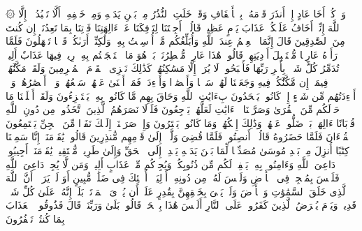 \stopbuffer
\startbuffer[\q:46:21]
۞ وَٱذۡكُرۡ أَخَا عَادٍ إِذۡ أَنذَرَ قَوۡمَهُۥ بِٱلۡأَحۡقَافِ وَقَدۡ خَلَتِ ٱلنُّذُرُ مِنۢ بَیۡنِ یَدَیۡهِ وَمِنۡ خَلۡفِهِۦۤ أَلَّا تَعۡبُدُوۤا۟ إِلَّا ٱللَّهَ إِنِّیۤ أَخَافُ عَلَیۡكُمۡ عَذَابَ یَوۡمٍ عَظِیمࣲ%
\stopbuffer
\startbuffer[\q:46:22]
قَالُوۤا۟ أَجِئۡتَنَا لِتَأۡفِكَنَا عَنۡ ءَالِهَتِنَا فَأۡتِنَا بِمَا تَعِدُنَاۤ إِن كُنتَ مِنَ ٱلصَّٰدِقِینَ%
\stopbuffer
\startbuffer[\q:46:23]
قَالَ إِنَّمَا ٱلۡعِلۡمُ عِندَ ٱللَّهِ وَأُبَلِّغُكُم مَّاۤ أُرۡسِلۡتُ بِهِۦ وَلَٰكِنِّیۤ أَرَىٰكُمۡ قَوۡمࣰا تَجۡهَلُونَ%
\stopbuffer
\startbuffer[\q:46:24]
فَلَمَّا رَأَوۡهُ عَارِضࣰا مُّسۡتَقۡبِلَ أَوۡدِیَتِهِمۡ قَالُوا۟ هَٰذَا عَارِضࣱ مُّمۡطِرُنَاۚ بَلۡ هُوَ مَا ٱسۡتَعۡجَلۡتُم بِهِۦۖ رِیحࣱ فِیهَا عَذَابٌ أَلِیمࣱ%
\stopbuffer
\startbuffer[\q:46:25]
تُدَمِّرُ كُلَّ شَیۡءِۭ بِأَمۡرِ رَبِّهَا فَأَصۡبَحُوا۟ لَا یُرَىٰۤ إِلَّا مَسَٰكِنُهُمۡۚ كَذَٰلِكَ نَجۡزِی ٱلۡقَوۡمَ ٱلۡمُجۡرِمِینَ%
\stopbuffer
\startbuffer[\q:46:26]
وَلَقَدۡ مَكَّنَّٰهُمۡ فِیمَاۤ إِن مَّكَّنَّٰكُمۡ فِیهِ وَجَعَلۡنَا لَهُمۡ سَمۡعࣰا وَأَبۡصَٰرࣰا وَأَفۡءِدَةࣰ فَمَاۤ أَغۡنَىٰ عَنۡهُمۡ سَمۡعُهُمۡ وَلَاۤ أَبۡصَٰرُهُمۡ وَلَاۤ أَفۡءِدَتُهُم مِّن شَیۡءٍ إِذۡ كَانُوا۟ یَجۡحَدُونَ بِءَایَٰتِ ٱللَّهِ وَحَاقَ بِهِم مَّا كَانُوا۟ بِهِۦ یَسۡتَهۡزِءُونَ%
\stopbuffer
\startbuffer[\q:46:27]
وَلَقَدۡ أَهۡلَكۡنَا مَا حَوۡلَكُم مِّنَ ٱلۡقُرَىٰ وَصَرَّفۡنَا ٱلۡءَایَٰتِ لَعَلَّهُمۡ یَرۡجِعُونَ%
\stopbuffer
\startbuffer[\q:46:28]
فَلَوۡلَا نَصَرَهُمُ ٱلَّذِینَ ٱتَّخَذُوا۟ مِن دُونِ ٱللَّهِ قُرۡبَانًا ءَالِهَةَۢۖ بَلۡ ضَلُّوا۟ عَنۡهُمۡۚ وَذَٰلِكَ إِفۡكُهُمۡ وَمَا كَانُوا۟ یَفۡتَرُونَ%
\stopbuffer
\startbuffer[\q:46:29]
وَإِذۡ صَرَفۡنَاۤ إِلَیۡكَ نَفَرࣰا مِّنَ ٱلۡجِنِّ یَسۡتَمِعُونَ ٱلۡقُرۡءَانَ فَلَمَّا حَضَرُوهُ قَالُوۤا۟ أَنصِتُوا۟ۖ فَلَمَّا قُضِیَ وَلَّوۡا۟ إِلَىٰ قَوۡمِهِم مُّنذِرِینَ%
\stopbuffer
\startbuffer[\q:46:30]
قَالُوا۟ یَٰقَوۡمَنَاۤ إِنَّا سَمِعۡنَا كِتَٰبًا أُنزِلَ مِنۢ بَعۡدِ مُوسَىٰ مُصَدِّقࣰا لِّمَا بَیۡنَ یَدَیۡهِ یَهۡدِیۤ إِلَى ٱلۡحَقِّ وَإِلَىٰ طَرِیقࣲ مُّسۡتَقِیمࣲ%
\stopbuffer
\startbuffer[\q:46:31]
یَٰقَوۡمَنَاۤ أَجِیبُوا۟ دَاعِیَ ٱللَّهِ وَءَامِنُوا۟ بِهِۦ یَغۡفِرۡ لَكُم مِّن ذُنُوبِكُمۡ وَیُجِرۡكُم مِّنۡ عَذَابٍ أَلِیمࣲ%
\stopbuffer
\startbuffer[\q:46:32]
وَمَن لَّا یُجِبۡ دَاعِیَ ٱللَّهِ فَلَیۡسَ بِمُعۡجِزࣲ فِی ٱلۡأَرۡضِ وَلَیۡسَ لَهُۥ مِن دُونِهِۦۤ أَوۡلِیَاۤءُۚ أُو۟لَٰۤئِكَ فِی ضَلَٰلࣲ مُّبِینٍ%
\stopbuffer
\startbuffer[\q:46:33]
أَوَ لَمۡ یَرَوۡا۟ أَنَّ ٱللَّهَ ٱلَّذِی خَلَقَ ٱلسَّمَٰوَٰتِ وَٱلۡأَرۡضَ وَلَمۡ یَعۡیَ بِخَلۡقِهِنَّ بِقَٰدِرٍ عَلَىٰۤ أَن یُحۡۦِیَ ٱلۡمَوۡتَىٰۚ بَلَىٰۤۚ إِنَّهُۥ عَلَىٰ كُلِّ شَیۡءࣲ قَدِیرࣱ%
\stopbuffer
\startbuffer[\q:46:34]
وَیَوۡمَ یُعۡرَضُ ٱلَّذِینَ كَفَرُوا۟ عَلَى ٱلنَّارِ أَلَیۡسَ هَٰذَا بِٱلۡحَقِّۖ قَالُوا۟ بَلَىٰ وَرَبِّنَاۚ قَالَ فَذُوقُوا۟ ٱلۡعَذَابَ بِمَا كُنتُمۡ تَكۡفُرُونَ%
